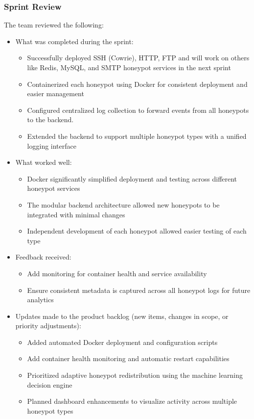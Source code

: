 \documentclass{article}
\begin{document}
\subsubsection{Sprint Review}
The team reviewed the following:

\begin{itemize}
    \item What was completed during the sprint:
    \begin{itemize}
        \item Successfully deployed SSH (Cowrie), HTTP, FTP and will work on others like Redis, MySQL, and SMTP honeypot services in the next sprint 
        \item Containerized each honeypot using Docker for consistent deployment and easier management
        \item Configured centralized log collection to forward events from all honeypots to the backend.
        \item Extended the backend to support multiple honeypot types with a unified logging interface
    \end{itemize}
    \item What worked well:
       \begin{itemize}
        \item Docker significantly simplified deployment and testing across different honeypot services
        \item The modular backend architecture allowed new honeypots to be integrated with minimal changes
        \item Independent development of each honeypot allowed easier testing of each type
    \end{itemize}
    
    \item Feedback received:
    \begin{itemize}
        \item Add monitoring for container health and service availability
        \item Ensure consistent metadata is captured across all honeypot logs for future analytics
    \end{itemize}
    \item Updates made to the product backlog (new items, changes in scope, or priority adjustments):
    \begin{itemize}
        \item Added automated Docker deployment and configuration scripts
        \item Add container health monitoring and automatic restart capabilities
        \item Prioritized adaptive honeypot redistribution using the machine learning decision engine
        \item Planned dashboard enhancements to visualize activity across multiple honeypot types
    \end{itemize}
\end{itemize}
\end{document}
